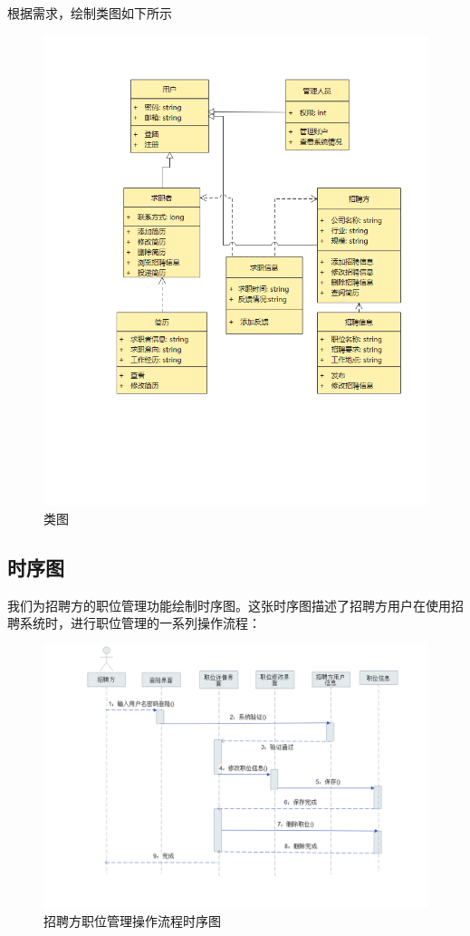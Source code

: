 \documentclass[UTF8,a4paper,10pt]{ctexart}
\begin{document}
根据需求，绘制类图如下所示

\begin{figure}[H]
    \centering
    \includegraphics[width=350pt]{img/类图.png}
    \caption{类图}
    \label{fig:类图}
\end{figure}

\subsection{时序图}

我们为招聘方的职位管理功能绘制时序图。这张时序图描述了招聘方用户在使用招聘系统时，进行职位管理的一系列操作流程：

\begin{figure}[H]
    \centering
    \includegraphics[width=\textwidth]{img/招聘方职位管理时序图.png} 
    \caption{招聘方职位管理操作流程时序图}
    \label{fig:招聘方职位管理时序图}
\end{figure}
\end{document}
